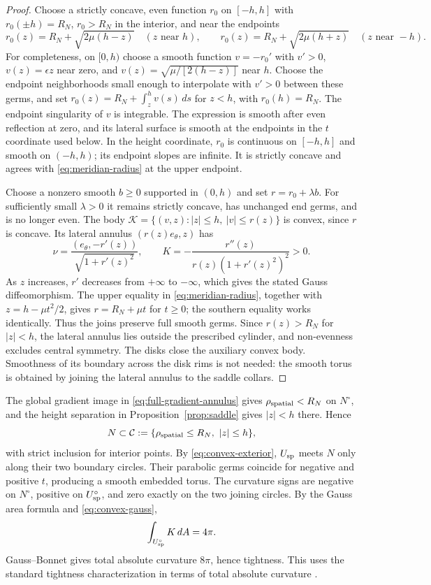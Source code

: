 \documentclass[11pt]{amsart}
\theoremstyle{definition}
\theoremstyle{remark}
\numberwithin{equation}{section}
\begin{document}
\begin{proof}
Choose a strictly concave, even function $r_0$ on $[-h,h]$ with
$r_0(\pm h)=R_N$, $r_0>R_N$ in the interior, and near the endpoints
\begin{equation}\label{eq:meridian-radius}
 r_0(z)=R_N+\sqrt{2\mu(h-z)}\quad(z\text{ near }h),
 \qquad
 r_0(z)=R_N+\sqrt{2\mu(h+z)}\quad(z\text{ near }-h).
\end{equation}
For completeness, on $[0,h)$ choose a smooth function $v=-r_0'$
with $v'>0$, $v(z)=\epsilon z$ near zero, and
$v(z)=\sqrt{\mu/[2(h-z)]}$ near $h$. Choose the endpoint
neighborhoods small enough to interpolate with $v'>0$ between
these germs, and set
$r_0(z)=R_N+\int_z^h v(s)\,ds$ for $z<h$, with $r_0(h)=R_N$.
The endpoint singularity of $v$ is integrable. The expression is smooth
after even reflection at zero, and its lateral surface is smooth at
the endpoints in the $t$ coordinate used below. In the height
coordinate, $r_0$ is continuous on $[-h,h]$ and smooth on $(-h,h)$;
its endpoint slopes are infinite. It is strictly concave and agrees with
\eqref{eq:meridian-radius} at the upper endpoint.

Choose a nonzero smooth $b\ge0$ supported in $(0,h)$ and set
$r=r_0+\lambda b$. For sufficiently small $\lambda>0$ it remains
strictly concave, has unchanged end germs, and is no longer even.
The body $\mathcal K=\{(v,z):|z|\le h,\ |v|\le r(z)\}$ is convex,
since $r$ is concave. Its lateral annulus $(r(z)e_\theta,z)$ has
\[
 \nu=\frac{(e_\theta,-r'(z))}{\sqrt{1+r'(z)^2}},\qquad
 K=-\frac{r''(z)}{r(z)(1+r'(z)^2)^2}>0.
\]
As $z$ increases, $r'$ decreases from $+\infty$ to $-\infty$,
which gives the stated Gauss diffeomorphism. The upper equality in
\eqref{eq:meridian-radius}, together with
$z=h-\mu t^2/2$, gives $r=R_N+\mu t$ for $t\ge0$;
the southern equality works identically. Thus the joins preserve
full smooth germs. Since $r(z)>R_N$ for $|z|<h$, the lateral annulus
lies outside the prescribed cylinder, and non-evenness excludes
central symmetry. The disks close the auxiliary convex body. Smoothness
of its boundary across the disk rims is not needed: the smooth torus
is obtained by joining the lateral annulus to the saddle collars.
\end{proof}

The global gradient image in \eqref{eq:full-gradient-annulus} gives
$\rho_{\rm spatial}<R_N$ on $N^\circ$, and the height separation
in Proposition~\ref{prop:saddle} gives $|z|<h$ there. Hence
\[
 N\subset\mathcal C:=\{\rho_{\rm spatial}\le R_N,\ |z|\le h\},
\]
with strict inclusion for interior points. By
\eqref{eq:convex-exterior}, $U_{\rm sp}$ meets $N$ only along their
two boundary circles. Their parabolic germs coincide for negative
and positive $t$, producing a smooth embedded torus.
The curvature signs are negative on $N^\circ$, positive on
$U_{\rm sp}^\circ$, and zero exactly on the two joining circles.
By the Gauss area formula and \eqref{eq:convex-gauss},
\begin{equation}\label{eq:positive-integral}
 \int_{U_{\rm sp}^\circ}K\,dA=4\pi.
\end{equation}
Gauss--Bonnet gives total absolute curvature $8\pi$, hence
tightness. This uses the standard tightness characterization in
terms of total absolute curvature \cite{BK}.
\end{document}
